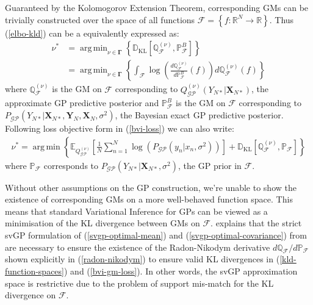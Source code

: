 \documentclass{article}
\newcommand{\KLD}{\operatorname{\mathbb{D}_{KL}}}
\newcommand{\GP}{\operatorname{\mathcal{GP}}}
\DeclareMathOperator*{\argmin}{arg\,min}
\numberwithin{equation}{section}
\begin{document}
Guaranteed by the Kolomogorov Extension Theorem,  corresponding GMs can be trivially constructed over the space of all functions $\mathcal{F} = \left\{f: \mathbb{R}^{N} \rightarrow \mathbb{R} \right\}$. Thus (\ref{elbo-kld}) can be a equivalently expressed as:
\begin{align}
    \label{kld-function-spaces}
    \nu^* &=\argmin_{\nu \in \mathbf{\Gamma}}  \left\{ \KLD\left[ \mathbb{Q}^{(\nu)}_\mathcal{F},  \mathbb{P}^B_\mathcal{F} \right] \right\} \\
    &= \argmin_{\nu \in \mathbf{\Gamma}} \left\{\int_{\mathcal{F}} \log \left( \frac{d \mathbb{Q}^{(\nu)}_\mathcal{F}}{d \mathbb{P}^B_\mathcal{F}} (f)\right)d \mathbb{Q}^{(\nu)}_\mathcal{F}(f) \right\}
    \label{radon-nikodym}
\end{align}
where $\mathbb{Q}^{(\nu)}_\mathcal{F}$ is the GM on $\mathcal{F}$ corresponding to $Q_{\GP}^{(\nu)}\left(Y_{N*} \vert \mathbf{X}_{N*}\right)$, the approximate GP predictive posterior and $\mathbb{P}^B_\mathcal{F}$ is the GM on $\mathcal{F}$ corresponding to $P_{\GP}\left(Y_{N*} \vert \mathbf{X}_{N*}, \mathbf{Y}_N, \mathbf{X}_N, \sigma^2 \right)$, the Bayesian exact GP predictive posterior. Following loss objective form in (\ref{bvi-loss}) we can also write:
\begin{align}
    \nu^* = \argmin \left\{ \mathbb{E}_{Q^{(\nu)}_{\GP}}\left[\frac{1}{N}\sum_{n=1}^N\log \left(P_{\GP}\left(y_n \vert x_n, \sigma^2\right)\right)\right] + \KLD \left[\mathbb{Q}^{(\nu)}_{\mathcal{F}}, \mathbb{P}_{\mathcal{F}} \right] \right\}
    \label{bvi-gm-loss}
\end{align}
where $\mathbb{P}_\mathcal{F}$ corresponds to $P_{\GP}\left(Y_{N*} \vert \mathbf{X}_{N*}, \sigma^2 \right)$, the GP prior in $\mathcal{F}$.

Without other assumptions on the GP construction, we're unable to show the existence of corresponding GMs on a more well-behaved function space. This means that standard Variational Inference for GPs can be viewed as a minimisation of the KL divergence between GMs on $\mathcal{F}$. \cite{matthews2017scalable} explains that the strict svGP formulation of (\ref{svgp-optimal-mean}) and (\ref{svgp-optimal-covariance}) from \cite{titsias2009variational} are necessary to ensure the existence of the Radon-Nikodym derivative $d \mathbb{Q}_\mathcal{F}/d \mathbb{P}_\mathcal{F}$ shown explicitly in (\ref{radon-nikodym}) to ensure valid KL divergences in (\ref{kld-function-spaces}) and (\ref{bvi-gm-loss}). In other words, the svGP approximation space is restrictive due to the problem of support mis-match for the KL divergence on $\mathcal{F}$.
\end{document}
